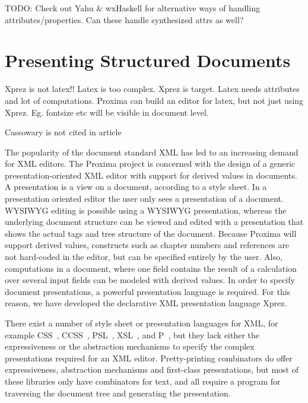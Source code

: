 
\bc
TODO:
Check out  Yahu & wxHaskell for alternative ways of handling attributes/properties. Can these handle synthesized attrs as well?
\ec


\def\ch{chap:presenting}
\chapter{Presenting Structured Documents}
\label{\ch}

{\sc Xprez} is not latex!! Latex is too complex. {\sc Xprez} is target. Latex needs attributes and lot of computations. Proxima can build an editor for latex, but not just using {\sc Xprez}. Eg. fontsize etc will be visible in document level.

Cassowary is not cited in article


The popularity of the document standard XML has led to an increasing demand for XML editors. The Proxima project is concerned with the design of a generic presentation-oriented XML editor with support for derived values in documents. A presentation is a view on a document, according to a style sheet. In a presentation oriented editor the user only sees a presentation of a document. WYSIWYG editing is possible using a WYSIWYG presentation, whereas the underlying document structure can be viewed and edited with a presentation that shows the actual tags and tree structure of the document. Because Proxima will support derived values, constructs such as chapter numbers and references are not hard-coded in the editor, but can be specified entirely by the user. Also, computations in a document, where one field contains the result of a calculation over several input fields can be modeled with derived values. In order to specify document presentations, a powerful presentation language is required. For this reason, we have developed the declarative XML presentation language {\sc Xprez}.

There exist a number of style sheet or presentation languages for XML, for example CSS~\cite{css}, CCSS~\cite{badros99ccss}, PSL~\cite{marden98psl}, XSL~\cite{xsl}, and P~\cite{quint97thot}, but they lack either the expressiveness or the abstraction mechanisms to specify the complex presentations required for an XML editor. Pretty-printing combinators \cite{oppen80prettyPrinting,swierstra,hughes1995prettyPrinting,kahl99galleyCombs,brand96generationOfFormatters} do offer expressiveness, abstraction mechanisms and first-class presentations, but most of these libraries only have combinators for text, and all require a program for traversing the document tree and generating the presentation. 

